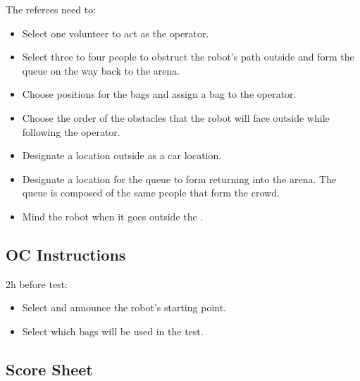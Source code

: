 The referees need to:
\begin{itemize}[nosep]
	\item Select one volunteer to act as the operator.
	\item Select three to four people to obstruct the robot's path outside and form the queue on the way back to the arena.
	\item Choose positions for the bags and assign a bag to the operator.
	\item Choose the order of the obstacles that the robot will face outside while following the operator.
	\item Designate a location outside as a car location.
	\item Designate a location for the queue to form returning into the arena. The queue is composed of the same people that form the crowd.
	\item Mind the robot when it goes outside the \Arena{}.
\end{itemize}

\subsection*{OC Instructions}

2h before test:
\begin{itemize}[nosep]
	\item Select and announce the robot's starting point.
	\item Select which bags will be used in the test.
\end{itemize}

\subsection*{Score Sheet}

